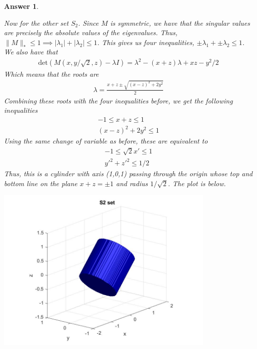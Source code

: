 \documentclass[12pt]{article}
\theoremstyle{colon}
\newtheorem*{answer}{Answer}
\begin{document}
\begin{answer}
\begin{enumerate}[label=\arabic*)]
      Now for the other set $S_2$. Since $M$ is symmetric, we have that the singular values are precisely the absolute values of the eigenvalues. Thus, $\lVert M \rVert_* \leq 1 \implies \lvert \lambda_1 \rvert + \lvert \lambda_2 \rvert \leq 1$. This gives us four inequalities, $\pm \lambda_1 + \pm \lambda_2 \leq 1$. We also have that
      \begin{gather*}
        \text{det}(M(x, y/\sqrt{2}, z) - \lambda I) = \lambda^2 - (x+z) \lambda + xz - y^2/2
      \end{gather*}
      Which means that the roots are
      \begin{gather*}
        \lambda = \frac{x+z \pm \sqrt{(x-z)^2 + 2y^2}}{2}
      \end{gather*}
      Combining these roots with the four inequalities before, we get the following inequalities
      \begin{gather*}
        -1 \leq x + z \leq 1 \\
        (x - z)^2 + 2 y^2 \leq 1
      \end{gather*}
      Using the same change of variable as before, these are equivalent to
      \begin{gather*}
        -1 \leq \sqrt{2} x' \leq 1 \\
        y'^2 + z'^2 \leq 1/2
      \end{gather*}
      Thus, this is a cylinder with axis (1,0,1) passing through the origin whose top and bottom line on the plane $x+z = \pm 1$ and radius $1/\sqrt{2}$. The plot is below.

      \begin{center}
        \includegraphics[width=0.8\textwidth]{41_cylinder.jpg}
      \end{center}


\end{enumerate}
\end{answer}
\end{document}

